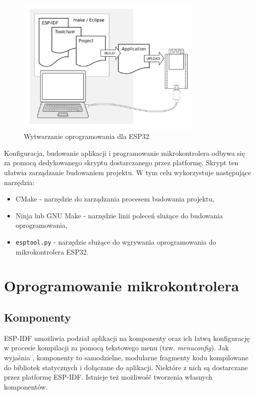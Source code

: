         \begin{figure}[]
            \centering
            \includegraphics[width=0.8\textwidth]{chapters/images/esp32_dev.png}
            \caption{Wytwarzanie oprogramowania dla ESP32}
            \label{fig:esp32_dev}
        \end{figure}

        Konfiguracja, budowanie aplikacji i programowanie mikrokontrolera odbywa się za pomocą dedykowanego skryptu dostarczanego przez platformę. Skrypt ten ułatwia zarządzanie budowaniem projektu. W tym celu wykorzystuje następujące narzędzia:

        \begin{itemize}
            \item CMake - narzędzie do zarządzania procesem budowania projektu,
            \item Ninja lub GNU Make -  narzędzie linii poleceń slużące do budowania oprogramowania,
            \item \texttt{esptool.py} - narzędzie służące do wgrywania oprogramowania do mikrokontrolera ESP32.
        \end{itemize}

    \section{Oprogramowanie mikrokontrolera}

        \subsection{Komponenty}

            ESP-IDF umożliwia podział aplikacji na komponenty oraz ich łatwą konfigurację w procesie kompilacji za pomocą tekstowego menu (tzw. \textit{menuconfig}). Jak wyjaśnia \cite{esp-idf-build-system}, komponenty to samodzielne, modularne fragmenty kodu kompilowane do bibliotek statycznych i dołączane do aplikacji. Niektóre z nich są dostarczane przez platformę ESP-IDF. Istnieje też możliwość tworzenia własnych komponentów.

